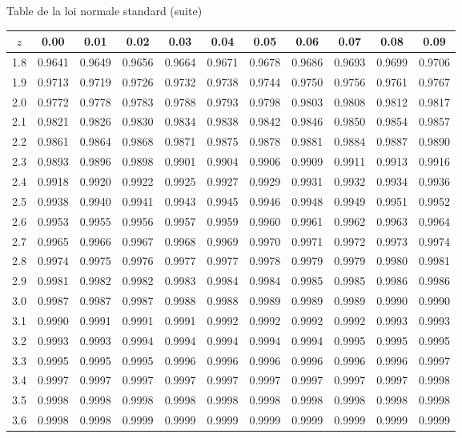 \documentclass{BeamerTemplate}
\begin{document}
\begin{frame}[t]{Table de la loi normale standard (suite)}
  \centering\tiny
  \renewcommand{\arraystretch}{0.95}
  \setlength{\tabcolsep}{4pt}
  \begin{tabular}{c|cccccccccc}
    \toprule
    $z$ & 0.00 & 0.01 & 0.02 & 0.03 & 0.04 & 0.05 & 0.06 & 0.07 & 0.08 & 0.09 \\
    \midrule
1.8 & 0.9641 & 0.9649 & 0.9656 & 0.9664 & 0.9671 & 0.9678 & 0.9686 & 0.9693 & 0.9699 & 0.9706 \\
1.9 & 0.9713 & 0.9719 & 0.9726 & 0.9732 & 0.9738 & 0.9744 & 0.9750 & 0.9756 & 0.9761 & 0.9767 \\
\midrule
2.0 & 0.9772 & 0.9778 & 0.9783 & 0.9788 & 0.9793 & 0.9798 & 0.9803 & 0.9808 & 0.9812 & 0.9817 \\
2.1 & 0.9821 & 0.9826 & 0.9830 & 0.9834 & 0.9838 & 0.9842 & 0.9846 & 0.9850 & 0.9854 & 0.9857 \\
2.2 & 0.9861 & 0.9864 & 0.9868 & 0.9871 & 0.9875 & 0.9878 & 0.9881 & 0.9884 & 0.9887 & 0.9890 \\
2.3 & 0.9893 & 0.9896 & 0.9898 & 0.9901 & 0.9904 & 0.9906 & 0.9909 & 0.9911 & 0.9913 & 0.9916 \\
2.4 & 0.9918 & 0.9920 & 0.9922 & 0.9925 & 0.9927 & 0.9929 & 0.9931 & 0.9932 & 0.9934 & 0.9936 \\
\midrule
2.5 & 0.9938 & 0.9940 & 0.9941 & 0.9943 & 0.9945 & 0.9946 & 0.9948 & 0.9949 & 0.9951 & 0.9952 \\
2.6 & 0.9953 & 0.9955 & 0.9956 & 0.9957 & 0.9959 & 0.9960 & 0.9961 & 0.9962 & 0.9963 & 0.9964 \\
2.7 & 0.9965 & 0.9966 & 0.9967 & 0.9968 & 0.9969 & 0.9970 & 0.9971 & 0.9972 & 0.9973 & 0.9974 \\
2.8 & 0.9974 & 0.9975 & 0.9976 & 0.9977 & 0.9977 & 0.9978 & 0.9979 & 0.9979 & 0.9980 & 0.9981 \\
2.9 & 0.9981 & 0.9982 & 0.9982 & 0.9983 & 0.9984 & 0.9984 & 0.9985 & 0.9985 & 0.9986 & 0.9986 \\
\midrule
3.0 & 0.9987 & 0.9987 & 0.9987 & 0.9988 & 0.9988 & 0.9989 & 0.9989 & 0.9989 & 0.9990 & 0.9990 \\
3.1 & 0.9990 & 0.9991 & 0.9991 & 0.9991 & 0.9992 & 0.9992 & 0.9992 & 0.9992 & 0.9993 & 0.9993 \\
3.2 & 0.9993 & 0.9993 & 0.9994 & 0.9994 & 0.9994 & 0.9994 & 0.9994 & 0.9995 & 0.9995 & 0.9995 \\
3.3 & 0.9995 & 0.9995 & 0.9995 & 0.9996 & 0.9996 & 0.9996 & 0.9996 & 0.9996 & 0.9996 & 0.9997 \\
3.4 & 0.9997 & 0.9997 & 0.9997 & 0.9997 & 0.9997 & 0.9997 & 0.9997 & 0.9997 & 0.9997 & 0.9998 \\
\midrule
3.5 & 0.9998 & 0.9998 & 0.9998 & 0.9998 & 0.9998 & 0.9998 & 0.9998 & 0.9998 & 0.9998 & 0.9998 \\
3.6 & 0.9998 & 0.9998 & 0.9999 & 0.9999 & 0.9999 & 0.9999 & 0.9999 & 0.9999 & 0.9999 & 0.9999 \\
    \bottomrule
  \end{tabular}


\end{frame}
\end{document}
